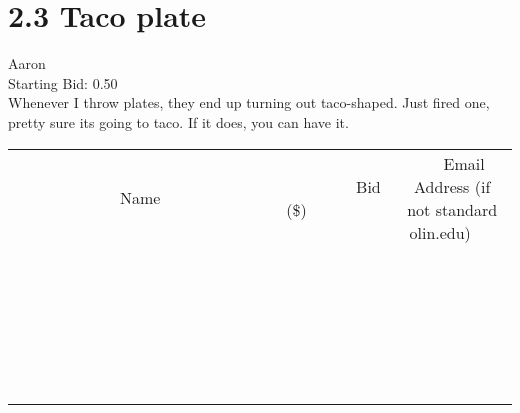 \documentclass[11pt]{article}
\begin{document}
					\section*{2.3 Taco plate}
					Aaron \\
					Starting Bid: 0.50 \\
					Whenever I throw plates, they end up turning out taco-shaped. Just fired one, pretty sure its going to taco. If it does, you can have it. \\
					[6ex]
					\begin{tabular}{c c c}
						~~~~~~~~~~~~~Name~~~~~~~~~~~~~ & ~~~~~~~~~Bid (\$)~~~~~~~~~ & ~~~Email Address (if not standard olin.edu)~~~ \\
				
 & & \\
\hline
 & & \\
\hline
 & & \\
\hline
 & & \\
\hline
 & & \\
\hline
 & & \\
\hline
 & & \\
\hline
 & & \\
\hline
 & & \\
\hline
 & & \\
\hline
 & & \\
\hline
 & & \\
\hline
 & & \\
\hline
 & & \\
\hline
 & & \\
\hline
 & & \\
\hline
 & & \\
\hline
 & & \\
\hline
 & & \\
\hline
 & & \\
\hline
 & & \\
\hline
 & & \\
\hline
 & & \\
\hline
 & & \\
\hline
 & & \\
\hline
 & & \\
\hline
					\end{tabular}
					\clearpage
				
\end{document}
